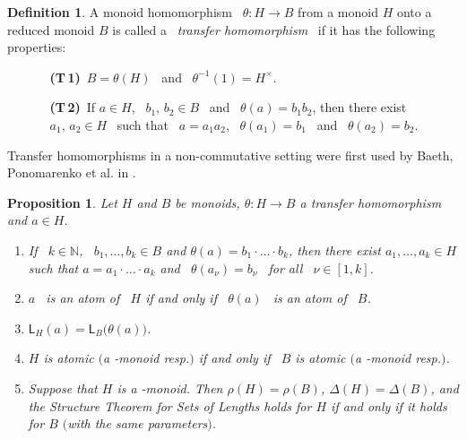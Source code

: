 \documentclass[a4paper]{amsart}
\newtheorem{proposition}[theorem]{Proposition}
\theoremstyle{definition}
\newtheorem{definition}[theorem]{Definition}
\numberwithin{equation}{section}
\begin{document}
\medskip
\begin{definition} \label{6.3}
A monoid homomorphism \ $\theta \colon H \to B$ from a monoid $H$ onto a reduced monoid
$B$ is called a \ {\it transfer homomorphism} \ if it has the
following properties:

\smallskip

\begin{enumerate}
\item[]
\begin{enumerate}
\item[{\bf (T\,1)\,}] $B = \theta(H) $ \ and \ $\theta
^{-1} (1) = H^\times$.

\smallskip

\item[{\bf (T\,2)\,}] If $a \in H$, \ $b_1,\,b_2 \in B$ \ and \ $\theta
(a) = b_1b_2$, then there exist \ $a_1,\,a_2 \in H$ \ such that \ $a
= a_1a_2$, \ $\theta (a_1) = b_1$ \ and \ $\theta (a_2) =
b_2$.
\end{enumerate}\end{enumerate}
\end{definition}

\medskip
Transfer homomorphisms in a non-commutative setting were first used by  Baeth,  Ponomarenko et al. in \cite{B-P-A-A-H-K-M-R11}.

\medskip
\begin{proposition} \label{6.4}
Let $H$ and $B$ be  monoids, $\theta \colon H \to B$  a transfer
homomorphism and $a \in H$.

\smallskip

\begin{enumerate}
\item
If \ $k \in {\mathbb N}$, \ $b_1, \ldots, b_k \in B$ and $\theta(a) =
b_1 \cdot\ldots\cdot b_k$, then there exist $a_1, \ldots, a_k \in H$
such that $a = a_1 \cdot\ldots\cdot a_k$ and \ $\theta
(a_\nu) = b_\nu$ \ for all \ $\nu \in [1,k]$.

\smallskip

\item $a$ \ is an atom of \ $H$ if and only if \ $\theta (a)$ \
is an atom of \ $B$.

\smallskip

\item  $\mathsf L_H(a) = \mathsf L_B \big(\theta(a) \big)$.

\smallskip
\item $H$ is atomic $($a {}-monoid resp.$)$ if and only if \ $B$ is atomic $($a {}-monoid resp.$)$.

\smallskip
\item Suppose that $H$ is a {}-monoid. Then $\rho (H) = \rho (B)$,
$\Delta (H) = \Delta (B)$, and the Structure Theorem for Sets of
Lengths holds for $H$ if and only if it holds for $B$ $($with the
same parameters$)$.
\end{enumerate}
\end{proposition}
\end{document}
